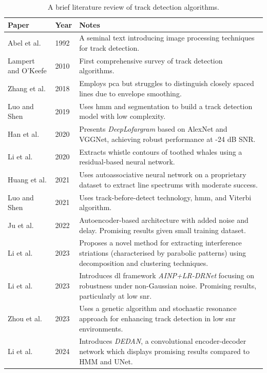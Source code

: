 \begin{table}
\centering
\begin{tabular}{llp{16cm}} %
\toprule
\textbf{Paper} & \textbf{Year} & \textbf{Notes} \\ \midrule
Abel et al. \cite{abel_image_1992} & 1992 & A seminal text introducing image processing techniques for track detection. \\
Lampert and O'Keefe \cite{lampert_survey_2010} & 2010 & First comprehensive survey of track detection algorithms. \\
Zhang et al. \cite{zhang_frequency_2018} & 2018 & Employs \acrshort{pca} but struggles to distinguish closely spaced lines due to envelope smoothing. \\
Luo and Shen \cite{luo_sensing_2019} & 2019 & Uses \acrshort{hmm} and segmentation to build a track detection model with low complexity. \\
Han et al. \cite{han_deeplofargram_2020} & 2020 & Presents \textit{DeepLofargram} based on AlexNet and VGGNet, achieving robust performance at -24 dB SNR.\\
Li et al. \cite{li_learning_2020} & 2020 & Extracts whistle contours of toothed whales using a residual-based neural network. \\
Huang et al. \cite{huang_line_2021} & 2021 & Uses autoassociative neural network on a proprietary dataset to extract line spectrums with moderate success. \\
Luo and Shen \cite{luo_space-frequency_2021} & 2021 & Uses track-before-detect technology, \acrshort{hmm}, and Viterbi algorithm. \\
Ju et al. \cite{ju_deeplearningbased_2022} & 2022 & Autoencoder-based architecture with added noise and delay. Promising results given small training dataset. \\
Li et al. \cite{li_method_2023} & 2023 & Proposes a novel method for extracting interference striations (characterised by parabolic patterns) using decomposition and clustering techniques.\\
Li et al. \cite{li_joint_2023} & 2023 & Introduces \acrshort{dl} framework \textit{AINP+LR-DRNet} focusing on robustness under non-Gaussian noise. Promising results, particularly at low \acrshort{snr}.\\
Zhou et al. \cite{zhou_weak_2023} & 2023 & Uses a genetic algorithm and stochastic resonance approach for enhancing track detection in low \acrshort{snr} environments. \\
Li et al. \cite{li_weak_2024} & 2024 & Introduces \textit{DEDAN}, a convolutional encoder-decoder network which displays promising results compared to HMM and UNet. \\ \bottomrule
\end{tabular}
\caption{A brief literature review of track detection algorithms.}
\label{tab:track-detection-review}
\end{table}

